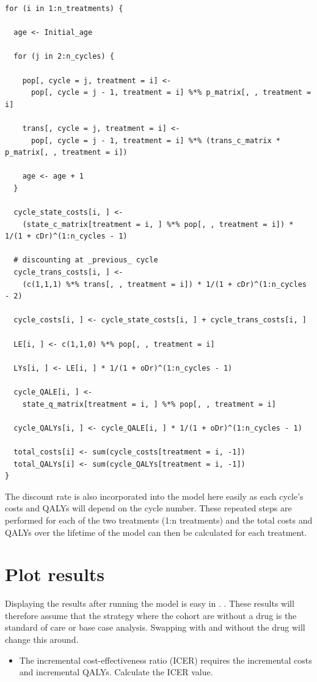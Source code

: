 \begin{verbatim}
for (i in 1:n_treatments) {
  
  age <- Initial_age
  
  for (j in 2:n_cycles) {
    
    pop[, cycle = j, treatment = i] <-
      pop[, cycle = j - 1, treatment = i] %*% p_matrix[, , treatment = i]
    
    trans[, cycle = j, treatment = i] <-
      pop[, cycle = j - 1, treatment = i] %*% (trans_c_matrix * p_matrix[, , treatment = i])
    
    age <- age + 1
  }
  
  cycle_state_costs[i, ] <-
    (state_c_matrix[treatment = i, ] %*% pop[, , treatment = i]) * 1/(1 + cDr)^(1:n_cycles - 1)
  
  # discounting at _previous_ cycle
  cycle_trans_costs[i, ] <-
    (c(1,1,1) %*% trans[, , treatment = i]) * 1/(1 + cDr)^(1:n_cycles - 2)
  
  cycle_costs[i, ] <- cycle_state_costs[i, ] + cycle_trans_costs[i, ]
  
  LE[i, ] <- c(1,1,0) %*% pop[, , treatment = i]
  
  LYs[i, ] <- LE[i, ] * 1/(1 + oDr)^(1:n_cycles - 1)
  
  cycle_QALE[i, ] <-
    state_q_matrix[treatment = i, ] %*% pop[, , treatment = i]
  
  cycle_QALYs[i, ] <- cycle_QALE[i, ] * 1/(1 + oDr)^(1:n_cycles - 1)
  
  total_costs[i] <- sum(cycle_costs[treatment = i, -1])
  total_QALYs[i] <- sum(cycle_QALYs[treatment = i, -1])
}
\end{verbatim}
 The discount rate is also incorporated into the model here easily as each cycle’s costs and QALYs will depend on the cycle number. These repeated steps are performed for each of the two treatments (1:n treatments) and the total costs and QALYs over the lifetime of the model can then be calculated for each treatment.

%
\section{Plot results}
Displaying the results after running the model is easy in \R. . These results will therefore assume that the strategy where the cohort are without a drug is the standard of care or base case analysis. Swapping with and without the drug will change this around.

\begin{itemize}
\item The incremental cost-effectiveness ratio (ICER) requires the incremental costs and incremental QALYs. Calculate the ICER value.
\end{itemize}


